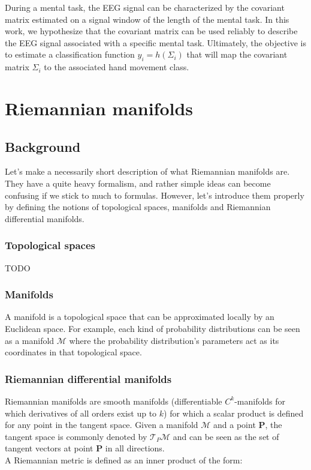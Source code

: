 \documentclass[a4paper,11pt]{report}
\begin{document}
During a mental task, the EEG signal can be characterized by the covariant matrix estimated on a signal window of the length of the mental task. In this work, we hypothesize that the covariant matrix can be used reliably to describe the EEG signal associated with a specific mental task. Ultimately, the objective is to estimate a classification function $y_i = h(\Sigma_{i})$ that will map the covariant matrix $\Sigma_{i}$ to the associated hand movement class.



\chapter{Riemannian manifolds}

\section{Background}

Let's make a necessarily short description of what Riemannian manifolds are. They have a quite heavy
formalism, and rather simple ideas can become confusing if we stick to much to formulas. However, let's introduce them
properly by defining the notions of topological spaces, manifolds and Riemannian differential manifolds.

\subsection{Topological spaces}

TODO

\subsection{Manifolds}

A manifold is a topological space that can be approximated locally by an Euclidean space. For example, each kind of probability distributions can be seen as a manifold $\mathcal{M}$ where the probability distribution's parameters act as its coordinates in that topological space. 

\subsection{Riemannian differential manifolds}

Riemannian manifolds are smooth manifolds (differentiable $C^k$-manifolds for which derivatives of all orders exist up to $k$)
for which a scalar product is defined for any point in the tangent space. Given a manifold $\mathcal{M}$ and a point $\textbf{P}$,
the tangent space is commonly denoted by $\mathcal{T}_P \mathcal{M}$ and can be seen as the set of tangent vectors at point $\textbf{P}$ in all directions.\\
A Riemannian metric is defined as an inner product of the form:
\end{document}

